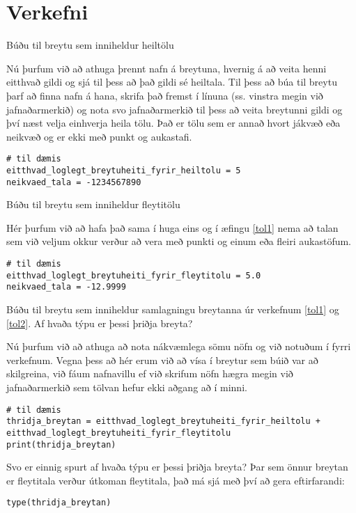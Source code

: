 \section{Verkefni}
\begin{exercise}\label{tol1}
		Búðu til breytu sem inniheldur heiltölu
	\end{exercise}
	\begin{Answer}[ref={tol1}]
		Nú þurfum við að athuga þrennt nafn á breytuna, hvernig á að veita henni eitthvað gildi og sjá til þess að það gildi sé heiltala.
		Til þess að búa til breytu þarf að finna nafn á hana, skrifa það fremst í línuna (ss. vinstra megin við jafnaðarmerkið) og nota svo jafnaðarmerkið til þess að veita breytunni gildi og því næst velja einhverja heila tölu.
		Það er tölu sem er annað hvort jákvæð eða neikvæð og er ekki með punkt og aukastafi.
\begin{lstlisting}
# til dæmis
eitthvad_loglegt_breytuheiti_fyrir_heiltolu = 5
neikvaed_tala = -1234567890\end{lstlisting}
\end{Answer}

\begin{exercise}\label{tol2}
	Búðu til breytu sem inniheldur fleytitölu
\end{exercise}
\begin{Answer}[ref={tol2}]
	Hér þurfum við að hafa það sama í huga eins og í æfingu \ref{tol1} nema að talan sem við veljum okkur verður að vera með punkti og einum eða fleiri aukastöfum.
\begin{lstlisting}
# til dæmis
eitthvad_loglegt_breytuheiti_fyrir_fleytitolu = 5.0
neikvaed_tala = -12.9999\end{lstlisting}
\end{Answer}

\begin{exercise}\label{tol2-5}
	Búðu til breytu sem inniheldur samlagningu breytanna úr verkefnum \ref{tol1} og \ref{tol2}. Af hvaða týpu er þessi þriðja breyta?
\end{exercise}
\begin{Answer}[ref={tol2-5}]
	Nú þurfum við að athuga að nota nákvæmlega sömu nöfn og við notuðum í fyrri verkefnum.
	Vegna þess að hér erum við að vísa í breytur sem búið var að skilgreina, við fáum nafnavillu ef við skrifum nöfn hægra megin við jafnaðarmerkið sem tölvan hefur ekki aðgang að í minni.
\begin{lstlisting}
# til dæmis
thridja_breytan = eitthvad_loglegt_breytuheiti_fyrir_heiltolu + eitthvad_loglegt_breytuheiti_fyrir_fleytitolu
print(thridja_breytan)\end{lstlisting}
	Svo er einnig spurt af hvaða týpu er þessi þriðja breyta?
	Þar sem önnur breytan er fleytitala verður útkoman fleytitala, það má sjá með því að gera eftirfarandi:
	
\begin{lstlisting}
type(thridja_breytan)\end{lstlisting}
\end{Answer}


